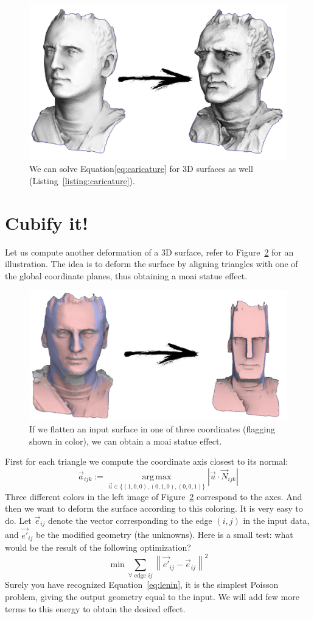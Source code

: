 \documentclass[notitlepage,oneside]{book}
\DeclareMathOperator*{\argmax}{arg\,max}
\begin{document}
\begin{figure}[ht]
    \centering
    \includegraphics[width=.75\linewidth]{img/caricature.jpg}
    \caption{We can solve Equation\eqref{eq:caricature} for 3D surfaces as well (Listing~\ref{listing:caricature}).}
    \label{fig:caricature}
\end{figure}

\newpage
\section{Cubify it!}
\label{sec:cubify}
Let us compute another deformation of a 3D surface, refer to Figure~\ref{fig:moai} for an illustration.
The idea is to deform the surface by aligning triangles with one of the global coordinate planes, thus obtaining a moai statue effect.
\begin{figure}[!h]
	\centering
	\includegraphics[width=.75\linewidth]{img/cubify-flagging.jpg}
	\caption{If we flatten an input surface in one of three coordinates (flagging shown in color), we can obtain a moai statue effect.}
	\label{fig:moai}
\end{figure}

First for each triangle we compute the coordinate axis closest to its normal:
$$
\vec{a}_{ijk} := \argmax\limits_{\vec{u}\in \{(1,0,0), (0,1,0), (0,0,1)\}} \left|\vec{u} \cdot \vec{N}_{ijk}\right| 
$$
Three different colors in the left image of Figure~\ref{fig:moai} correspond to the axes.
And then we want to deform the surface according to this coloring.
It is very easy to do. Let $\vec{e}_{ij}$ denote the vector corresponding to the edge $(i,j)$ in the input data,
and $\vec{e'}_{ij}$ be the modified geometry (the unknowns).
Here is a small test: what would be the result of the following optimization?
$$
\min \sum\limits_{\forall \text{~edge~} ij}\left\|\vec{e'}_{ij} - \vec{e}_{ij}\right\|^2
$$
Surely you have recognized Equation~\eqref{eq:lenin}, it is the simplest Poisson problem, giving the output geometry equal to the input.
We will add few more terms to this energy to obtain the desired effect.
\end{document}

